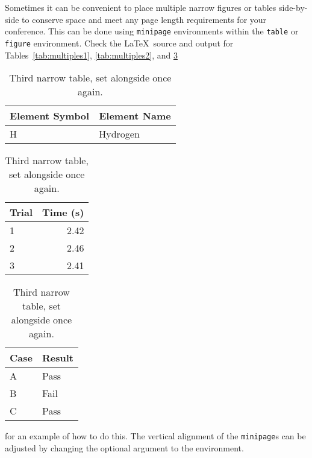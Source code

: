 \documentclass[aip,cp,amsmath,amssymb,reprint]{revtex4-2}
\begin{document}
Sometimes it can be convenient to place multiple narrow figures or tables side-by-side to conserve space and meet any page length requirements for your conference. This can be done using \texttt{minipage} environments within the \texttt{table} or \texttt{figure} environment. Check the \LaTeX\ source and output for Tables~\ref{tab:multiples1}, \ref{tab:multiples2}, and \ref{tab:multiples3}
\begin{table}[tbp]
\begin{minipage}[t]{0.3\textwidth}
    \caption{First narrow table.}
    \label{tab:multiples1}
    \begin{ruledtabular}
    \begin{tabular}{ll}
        Element Symbol & Element Name \\
        \hline
        H & Hydrogen \\
    \end{tabular}
    \end{ruledtabular}
\end{minipage}\hfill%
\begin{minipage}[t]{0.3\textwidth}
    \caption{Second narrow table, set alongside.}
    \label{tab:multiples2}
    \begin{ruledtabular}
    \begin{tabular}{lr}
        Trial & Time (s) \\
        \hline
        1 & 2.42 \\
        2 & 2.46 \\
        3 & 2.41 \\
    \end{tabular}
    \end{ruledtabular}
\end{minipage}\hfill%
\begin{minipage}[t]{0.3\textwidth}
    \caption{Third narrow table, set alongside once again.}
    \label{tab:multiples3}
    \begin{ruledtabular}
    \begin{tabular}{ll}
        Case & Result \\
        \hline
        A & Pass \\
        B & Fail \\
        C & Pass \\
    \end{tabular}
    \end{ruledtabular}
\end{minipage}
\end{table}
for an example of how to do this. The vertical alignment of the \texttt{minipage}s can be adjusted by changing the optional argument to the environment.
\end{document}
